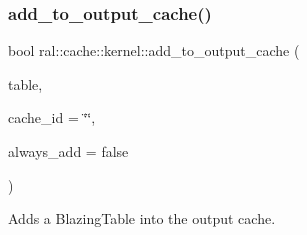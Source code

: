 \subsubsection{\texorpdfstring{add\+\_\+to\+\_\+output\+\_\+cache()}{add\_to\_output\_cache()}\hspace{0.1cm}{\footnotesize\ttfamily [1/3]}}
{\footnotesize\ttfamily bool ral\+::cache\+::kernel\+::add\+\_\+to\+\_\+output\+\_\+cache (\begin{DoxyParamCaption}\item[{std\+::unique\+\_\+ptr$<$ \hyperlink{classral_1_1frame_1_1BlazingTable}{ral\+::frame\+::\+Blazing\+Table} $>$}]{table,  }\item[{std\+::string}]{cache\+\_\+id = {\ttfamily \char`\"{}\char`\"{}},  }\item[{bool}]{always\+\_\+add = {\ttfamily false} }\end{DoxyParamCaption})}



Adds a Blazing\+Table into the output cache. 


